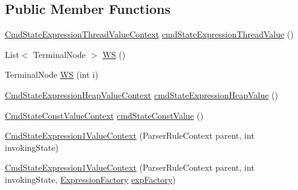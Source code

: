 \subsection*{Public Member Functions}
\begin{DoxyCompactItemize}
\item 
\hyperlink{classgov_1_1nasa_1_1jpf_1_1inspector_1_1server_1_1expression_1_1parser_1_1_expression_grammar_pa5a19a4a13564890289bc65b6a0372f78}{Cmd\+State\+Expression\+Thread\+Value\+Context} \hyperlink{classgov_1_1nasa_1_1jpf_1_1inspector_1_1server_1_1expression_1_1parser_1_1_expression_grammar_paacaa2424bb30d5b61478a2ac87dd697e_aca5365fbdf1e65483096827f12d71d74}{cmd\+State\+Expression\+Thread\+Value} ()
\item 
List$<$ Terminal\+Node $>$ \hyperlink{classgov_1_1nasa_1_1jpf_1_1inspector_1_1server_1_1expression_1_1parser_1_1_expression_grammar_paacaa2424bb30d5b61478a2ac87dd697e_ab34d9a2fa6a0934d3037c37c3cd5a44b}{WS} ()
\item 
Terminal\+Node \hyperlink{classgov_1_1nasa_1_1jpf_1_1inspector_1_1server_1_1expression_1_1parser_1_1_expression_grammar_paacaa2424bb30d5b61478a2ac87dd697e_a9f8d2108dd897efb22f0979a352d7e23}{WS} (int i)
\item 
\hyperlink{classgov_1_1nasa_1_1jpf_1_1inspector_1_1server_1_1expression_1_1parser_1_1_expression_grammar_pa975e8909fcf76b653e93728b8bf729a1}{Cmd\+State\+Expression\+Heap\+Value\+Context} \hyperlink{classgov_1_1nasa_1_1jpf_1_1inspector_1_1server_1_1expression_1_1parser_1_1_expression_grammar_paacaa2424bb30d5b61478a2ac87dd697e_aa54aa3a2fbb23034c133c33e1e15bb4c}{cmd\+State\+Expression\+Heap\+Value} ()
\item 
\hyperlink{classgov_1_1nasa_1_1jpf_1_1inspector_1_1server_1_1expression_1_1parser_1_1_expression_grammar_pa618023edddc6cf63ca4452111d0560c6}{Cmd\+State\+Const\+Value\+Context} \hyperlink{classgov_1_1nasa_1_1jpf_1_1inspector_1_1server_1_1expression_1_1parser_1_1_expression_grammar_paacaa2424bb30d5b61478a2ac87dd697e_a23815138a2883dc415c2daf209414e66}{cmd\+State\+Const\+Value} ()
\item 
\hyperlink{classgov_1_1nasa_1_1jpf_1_1inspector_1_1server_1_1expression_1_1parser_1_1_expression_grammar_paacaa2424bb30d5b61478a2ac87dd697e_ab6a49d98a383f6e8432a2abed33430cf}{Cmd\+State\+Expression1\+Value\+Context} (Parser\+Rule\+Context parent, int invoking\+State)
\item 
\hyperlink{classgov_1_1nasa_1_1jpf_1_1inspector_1_1server_1_1expression_1_1parser_1_1_expression_grammar_paacaa2424bb30d5b61478a2ac87dd697e_a99b8e9021fa46175707668fede324ba1}{Cmd\+State\+Expression1\+Value\+Context} (Parser\+Rule\+Context parent, int invoking\+State, \hyperlink{classgov_1_1nasa_1_1jpf_1_1inspector_1_1server_1_1expression_1_1_expression_factory}{Expression\+Factory} \hyperlink{classgov_1_1nasa_1_1jpf_1_1inspector_1_1server_1_1expression_1_1parser_1_1_expression_grammar_paacaa2424bb30d5b61478a2ac87dd697e_ab9f1bd3931200e3be4ec0c7b9365e015}{exp\+Factory})

\end{DoxyCompactItemize}
